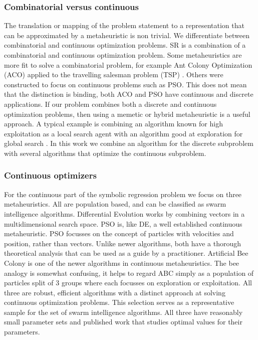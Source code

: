 \subsubsection{Combinatorial versus continuous}
The translation or mapping of the problem statement to a representation that can be approximated by a metaheuristic is non trivial.
We differentiate between combinatorial and continuous optimization problems. SR is a combination of a combinatorial and continuous optimization problem. Some metaheuristics are more fit to solve a combinatorial problem, for example Ant Colony Optimization (ACO) applied to the travelling salesman problem (TSP) \cite{ACO}. Others were constructed to focus on continuous problems such as PSO. This does not mean that the distinction is binding, both ACO and PSO have continuous and discrete applications. If our problem combines both a discrete and continuous optimization problems, then using a memetic or hybrid metaheuristic is a useful approach. A typical example is combining an algorithm known for high exploitation as a local search agent with an algorithm good at exploration for global search \cite{ABCPSO}.
In this work we combine an algorithm for the discrete subproblem with several algorithms that optimize the continuous subproblem. 

\subsubsection{Continuous optimizers}
For the continuous part of the symbolic regression problem we focus on three metaheuristics. All are population based, and can be classified as swarm intelligence algorithms. Differential Evolution \cite{DE} works by combining vectors in a multidimensional search space. PSO is, like DE, a well established continuous metaheuristic. PSO focusses on the concept of particles with velocities and position, rather than vectors. Unlike newer algorithms, both have a thorough theoretical analysis that can be used as a guide by a practitioner. Artificial Bee Colony \cite{ABC} is one of the newer algorithms in continuous metaheuristics. The bee analogy is somewhat confusing, it helps to regard ABC simply as a population of particles split of 3 groups where each focusses on exploration or exploitation. All three are robust, efficient algorithms with a distinct approach at solving continuous optimization problems. This selection serves as a representative sample for the set of swarm intelligence algorithms. All three have reasonably small parameter sets and published work that studies optimal values for their parameters.

